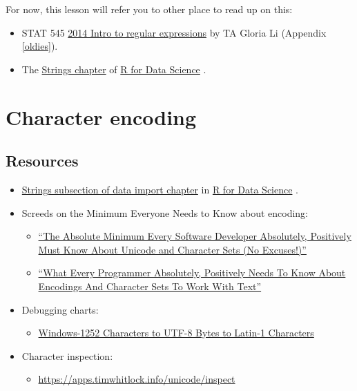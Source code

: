 \documentclass[
]{book}
\providecommand{\tightlist}{%
  \setlength{\itemsep}{0pt}\setlength{\parskip}{0pt}}
\begin{document}
For now, this lesson will refer you to other place to read up on this:

\begin{itemize}
\tightlist
\item
  STAT 545 \protect\hyperlink{oldies}{2014 Intro to regular expressions} by TA Gloria Li (Appendix \ref{oldies}).
\item
  The \href{https://r4ds.had.co.nz/strings.html}{Strings chapter} of \href{https://r4ds.had.co.nz}{R for Data Science} \citep{wickham2016}.
\end{itemize}

\hypertarget{character-encoding}{%
\chapter{Character encoding}\label{character-encoding}}

\hypertarget{resources}{%
\section{Resources}\label{resources}}

\begin{itemize}
\tightlist
\item
  \href{https://r4ds.had.co.nz/data-import.html\#readr-strings}{Strings subsection of data import chapter} in \href{https://r4ds.had.co.nz}{R for Data Science} \citep{wickham2016}.
\item
  Screeds on the Minimum Everyone Needs to Know about encoding:

  \begin{itemize}
  \tightlist
  \item
    \href{https://www.joelonsoftware.com/2003/10/08/the-absolute-minimum-every-software-developer-absolutely-positively-must-know-about-unicode-and-character-sets-no-excuses/}{``The Absolute Minimum Every Software Developer Absolutely, Positively Must Know About Unicode and Character Sets (No Excuses!)''}
  \item
    \href{http://kunststube.net/encoding/}{``What Every Programmer Absolutely, Positively Needs To Know About Encodings And Character Sets To Work With Text''}
  \end{itemize}
\item
  Debugging charts:

  \begin{itemize}
  \tightlist
  \item
    \href{http://www.i18nqa.com/debug/utf8-debug.html}{Windows-1252 Characters to UTF-8 Bytes to Latin-1 Characters}
  \end{itemize}
\item
  Character inspection:

  \begin{itemize}
  \tightlist
  \item
    \url{https://apps.timwhitlock.info/unicode/inspect}
  \end{itemize}
\end{itemize}
\end{document}
